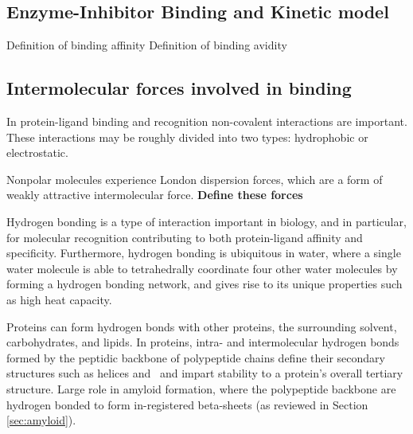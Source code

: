 \subsection{Enzyme-Inhibitor Binding and Kinetic model}
Definition of binding affinity
Definition of binding avidity

\subsection{Intermolecular forces involved in binding}



In protein-ligand binding and recognition non-covalent interactions are important.  These interactions may be roughly divided into two types: hydrophobic or electrostatic.   

Nonpolar molecules experience London dispersion forces, which are a form of weakly attractive intermolecular force. \textbf{Define these forces}

Hydrogen bonding is a type of interaction important in biology, and in particular, for molecular recognition contributing to both protein-ligand affinity and specificity. Furthermore, hydrogen bonding is ubiquitous in water, where a single water molecule is able to tetrahedrally coordinate four other water molecules by forming a hydrogen bonding network, and gives rise to its unique properties such as high heat capacity.

Proteins can form hydrogen bonds with other proteins, the surrounding solvent, carbohydrates, and lipids. In proteins, intra- and intermolecular hydrogen bonds formed by the peptidic backbone of polypeptide chains define their secondary structures such as helices and \bsheets\, and impart stability to a protein's overall tertiary structure.\cite{refs}  Large role in amyloid formation, where the polypeptide backbone are hydrogen bonded to form in-registered beta-sheets (as reviewed in Section \ref{sec:amyloid}).

